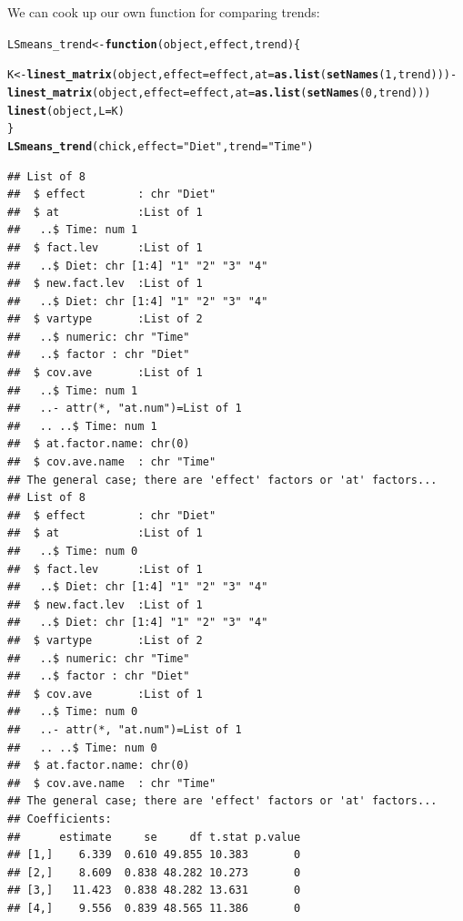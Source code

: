 \documentclass[10pt]{article}\usepackage[]{graphicx}\usepackage[]{color}
\makeatletter
\newcommand{\hlnum}[1]{\textcolor[rgb]{0.686,0.059,0.569}{#1}}%
\newcommand{\hlstr}[1]{\textcolor[rgb]{0.192,0.494,0.8}{#1}}%
\newcommand{\hlopt}[1]{\textcolor[rgb]{0,0,0}{#1}}%
\newcommand{\hlstd}[1]{\textcolor[rgb]{0.345,0.345,0.345}{#1}}%
\newcommand{\hlkwa}[1]{\textcolor[rgb]{0.161,0.373,0.58}{\textbf{#1}}}%
\newcommand{\hlkwb}[1]{\textcolor[rgb]{0.69,0.353,0.396}{#1}}%
\newcommand{\hlkwc}[1]{\textcolor[rgb]{0.333,0.667,0.333}{#1}}%
\newcommand{\hlkwd}[1]{\textcolor[rgb]{0.737,0.353,0.396}{\textbf{#1}}}%
\newenvironment{kframe}{%
 \def\at@end@of@kframe{}%
 \ifinner\ifhmode%
  \def\at@end@of@kframe{\end{minipage}}%
  \begin{minipage}{\columnwidth}%
 \fi\fi%
 \def\FrameCommand##1{\hskip\@totalleftmargin \hskip-\fboxsep
 \colorbox{shadecolor}{##1}\hskip-\fboxsep
     \hskip-\linewidth \hskip-\@totalleftmargin \hskip\columnwidth}%
 \MakeFramed {\advance\hsize-\width
   \@totalleftmargin\z@ \linewidth\hsize
   \@setminipage}}%
 {\par\unskip\endMakeFramed%
 \at@end@of@kframe}
\newenvironment{knitrout}{}{} %
\makeatother
\begin{document}
We can cook up our own function for comparing trends:
\begin{knitrout}
\color{fgcolor}\begin{kframe}
\begin{alltt}
\hlstd{LSmeans_trend} \hlkwb{<-} \hlkwa{function}\hlstd{(}\hlkwc{object}\hlstd{,} \hlkwc{effect}\hlstd{,} \hlkwc{trend}\hlstd{)\{}

    \hlstd{K}\hlkwb{<-}\hlkwd{linest_matrix}\hlstd{(object,} \hlkwc{effect}\hlstd{=effect,} \hlkwc{at}\hlstd{=}\hlkwd{as.list}\hlstd{(}\hlkwd{setNames}\hlstd{(}\hlnum{1}\hlstd{, trend)))} \hlopt{-}
        \hlkwd{linest_matrix}\hlstd{(object,} \hlkwc{effect}\hlstd{=effect,} \hlkwc{at}\hlstd{=}\hlkwd{as.list}\hlstd{(}\hlkwd{setNames}\hlstd{(}\hlnum{0}\hlstd{, trend)))}
    \hlkwd{linest}\hlstd{(object,} \hlkwc{L}\hlstd{=K)}
\hlstd{\}}
\hlkwd{LSmeans_trend}\hlstd{(chick,} \hlkwc{effect}\hlstd{=}\hlstr{"Diet"}\hlstd{,} \hlkwc{trend}\hlstd{=}\hlstr{"Time"}\hlstd{)}
\end{alltt}
\begin{verbatim}
## List of 8
##  $ effect        : chr "Diet"
##  $ at            :List of 1
##   ..$ Time: num 1
##  $ fact.lev      :List of 1
##   ..$ Diet: chr [1:4] "1" "2" "3" "4"
##  $ new.fact.lev  :List of 1
##   ..$ Diet: chr [1:4] "1" "2" "3" "4"
##  $ vartype       :List of 2
##   ..$ numeric: chr "Time"
##   ..$ factor : chr "Diet"
##  $ cov.ave       :List of 1
##   ..$ Time: num 1
##   ..- attr(*, "at.num")=List of 1
##   .. ..$ Time: num 1
##  $ at.factor.name: chr(0) 
##  $ cov.ave.name  : chr "Time"
## The general case; there are 'effect' factors or 'at' factors...
## List of 8
##  $ effect        : chr "Diet"
##  $ at            :List of 1
##   ..$ Time: num 0
##  $ fact.lev      :List of 1
##   ..$ Diet: chr [1:4] "1" "2" "3" "4"
##  $ new.fact.lev  :List of 1
##   ..$ Diet: chr [1:4] "1" "2" "3" "4"
##  $ vartype       :List of 2
##   ..$ numeric: chr "Time"
##   ..$ factor : chr "Diet"
##  $ cov.ave       :List of 1
##   ..$ Time: num 0
##   ..- attr(*, "at.num")=List of 1
##   .. ..$ Time: num 0
##  $ at.factor.name: chr(0) 
##  $ cov.ave.name  : chr "Time"
## The general case; there are 'effect' factors or 'at' factors...
## Coefficients:
##      estimate     se     df t.stat p.value
## [1,]    6.339  0.610 49.855 10.383       0
## [2,]    8.609  0.838 48.282 10.273       0
## [3,]   11.423  0.838 48.282 13.631       0
## [4,]    9.556  0.839 48.565 11.386       0
\end{verbatim}
\end{kframe}
\end{knitrout}
\end{document}

